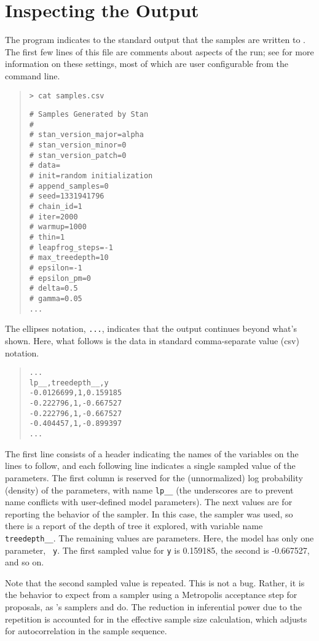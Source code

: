 \section{Inspecting the Output}

The program indicates to the standard output that the samples are
written to .  The first few lines of this file are
comments about aspects of the run; see  for more
information on these settings, most of which are user configurable
from the command line.
%
\begin{quote}
\begin{Verbatim}[fontshape=sl]
> cat samples.csv
\end{Verbatim}
\begin{Verbatim}
# Samples Generated by Stan
#
# stan_version_major=alpha
# stan_version_minor=0
# stan_version_patch=0
# data=
# init=random initialization
# append_samples=0
# seed=1331941796
# chain_id=1
# iter=2000
# warmup=1000
# thin=1
# leapfrog_steps=-1
# max_treedepth=10
# epsilon=-1
# epsilon_pm=0
# delta=0.5
# gamma=0.05
...
\end{Verbatim}
\end{quote}
%
The ellipses notation, {\tt ...}, indicates that the output continues
beyond what's shown.  Here, what follows is the data in standard
comma-separate value ({\sc csv}) notation.
%
\begin{quote}
\begin{Verbatim}
...
lp__,treedepth__,y
-0.0126699,1,0.159185
-0.222796,1,-0.667527
-0.222796,1,-0.667527
-0.404457,1,-0.899397
...
\end{Verbatim}
\end{quote}
%
The first line consists of a header indicating the names of the
variables on the lines to follow, and each following line indicates a
single sampled value of the parameters.  The first column is reserved
for the (unnormalized) log probability (density) of the parameters,
with name {\tt lp\_\_} (the underscores are to prevent name conflicts
with user-defined model parameters).  The next values are for
reporting the behavior of the sampler.  In this case, the \NUTS
sampler was used, so there is a report of the depth of tree it
explored, with variable name {\tt treedepth\_\_}.  The remaining
values are parameters.  Here, the model has only one parameter, {\tt
  y}.  The first sampled value for {\tt y} is 0.159185, the second is
-0.667527, and so on.  

Note that the second sampled value is repeated.  This is not a bug.
Rather, it is the behavior to expect from a sampler using a Metropolis
acceptance step for proposals, as \Stan's samplers \HMC and \NUTS do.
The reduction in inferential power due to the repetition is accounted
for in the effective sample size calculation, which adjusts for
autocorrelation in the sample sequence.


